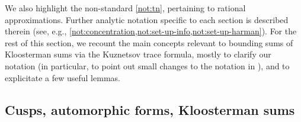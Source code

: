 \documentclass[reqno,11pt]{amsart}
\theoremstyle{remark}
\numberwithin{equation}{section}
\begin{document}
We also highlight the non-standard \cref{not:tn}, pertaining to rational approximations.
Further analytic notation specific to each section is described therein (see, e.g., \cref{not:concentration,not:set-up-info,not:set-up-harman}).
For the rest of this section, we recount the main concepts relevant to bounding sums of Kloosterman sums via the Kuznetsov trace formula, mostly to clarify our notation (in particular, to point out small changes to the notation in \cite{deshouillers1982kloosterman}), and to explicitate a few useful lemmas.


\subsection{Cusps, automorphic forms, Kloosterman sums} \label{subsec:automorphic}
\end{document}
